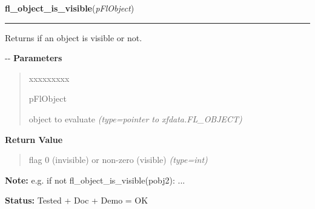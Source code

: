 \hspace{.8\funcindent}\begin{boxedminipage}{\funcwidth}

    \raggedright \textbf{fl\_object\_is\_visible}(\textit{pFlObject})

    \vspace{-1.5ex}

    \rule{\textwidth}{0.5\fboxrule}
\setlength{\parskip}{2ex}

Returns if an object is visible or not.

-{}-
\setlength{\parskip}{1ex}
      \textbf{Parameters}
      \vspace{-1ex}

      \begin{quote}
        \begin{Ventry}{xxxxxxxxx}

          \item[pFlObject]


object to evaluate
            {\it (type=pointer to xfdata.FL\_OBJECT)}

        \end{Ventry}

      \end{quote}

      \textbf{Return Value}
    \vspace{-1ex}

      \begin{quote}

flag 0 (invisible) or non-zero (visible)
      {\it (type=int)}

      \end{quote}

\textbf{Note:} 
e.g. if not fl\_object\_is\_visible(pobj2): ...


\textbf{Status:} 
Tested + Doc + Demo = OK


    \end{boxedminipage}

    \label{xformslib:flbasic:fl_free_object}

    \vspace{0.5ex}


